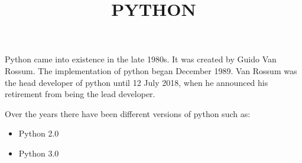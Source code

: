 \documentclass{article}
\title{PYTHON}
\begin{document}
	\maketitle 
	Python came into existence in the late 1980s. It was created by Guido Van Rossum. The implementation of python began December 1989. Van Rossum was the head developer of python until 12 July 2018, when he announced his retirement from being the lead developer.
	
	Over the years there have been different versions of python such as:
	
	\begin{itemize}
		\item Python 2.0
		\item Python 3.0
		\end{itemize}
	
\end{document}
